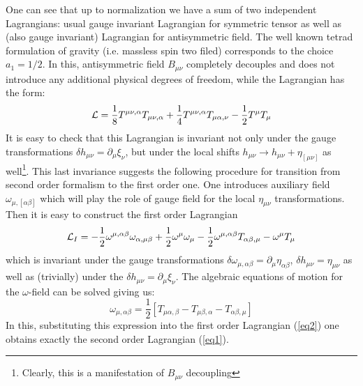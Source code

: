 \documentclass[a4paper,12pt]{article}
\begin{document}
One can see that up to normalization we have a sum of two independent
Lagrangians: usual gauge invariant Lagrangian for symmetric tensor as
well as (also gauge invariant) Lagrangian for antisymmetric field.
The well known tetrad formulation of gravity (i.e. massless spin two
filed) corresponds to the choice $a_1 = 1/2$. In this, antisymmetric
field $B_{\mu\nu}$ completely decouples and does not introduce any
additional physical degrees of freedom, while the Lagrangian has the
form:
\begin{equation}
{\cal L} = \frac{1}{8} T^{\mu\nu,\alpha} T_{\mu\nu,\alpha} +
\frac{1}{4} T^{\mu\nu,\alpha} T_{\mu\alpha,\nu} - \frac{1}{2}
T^\mu T_\mu \label{eq1}
\end{equation}
It is easy to check that this Lagrangian is invariant not only under
the gauge transformations $\delta h_{\mu\nu} = \partial_\mu \xi_\nu$,
but under the local shifts $h_{\mu\nu} \rightarrow h_{\mu\nu} +
\eta_{[\mu\nu]}$ as well\footnote{Clearly, this is a manifestation of
$B_{\mu\nu}$ decoupling}. This last invariance suggests the following
procedure for transition from second order formalism to the first
order one. One introduces auxiliary field $\omega_{\mu,[\alpha\beta]}$
which will play the role of gauge field for the local $\eta_{\mu\nu}$
transformations. Then it is easy to construct the first order
Lagrangian
\begin{equation}
{\cal L}_I = - \frac{1}{2} \omega^{\mu,\alpha\beta}
\omega_{\alpha,\mu\beta} + \frac{1}{2} \omega^\mu \omega_\mu -
\frac{1}{2} \omega^{\mu,\alpha\beta} T_{\alpha\beta,\mu} - \omega^\mu
T_\mu \label{eq2}
\end{equation}
which is invariant under the gauge transformations
$\delta \omega_{\mu,\alpha\beta} = \partial_\mu \eta_{\alpha\beta}$,
$\delta h_{\mu\nu} = \eta_{\mu\nu}$ as well as (trivially) under the
$\delta h_{\mu\nu} = \partial_\mu \xi_\nu$. The algebraic equations of
motion for the $\omega$-field can be solved giving us:
\begin{equation}
\omega_{\mu,\alpha\beta} = \frac{1}{2} [ T_{\mu\alpha,\beta} -
T_{\mu\beta,\alpha} - T_{\alpha\beta,\mu} ]
\end{equation}
In this, substituting this expression into the first order Lagrangian
(\ref{eq2}) one obtains exactly the second order Lagrangian
(\ref{eq1}).
\end{document}
